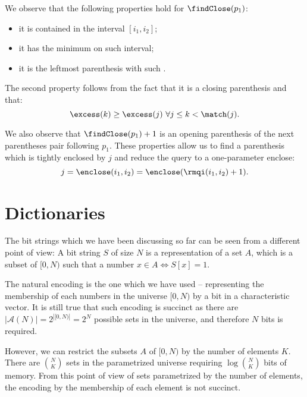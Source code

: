 We observe that the following properties hold for $\findClose(p_1)$:
\begin{itemize}
	\item it is contained in the interval $[i_1, i_2]$;
	\item it has the minimum \excess{} on such interval;
	\item it is the leftmost parenthesis with such \excess{}.
\end{itemize}
The second property follows from the fact that it is a closing parenthesis and that:
$$ \excess(k) \ge \excess(j) \ \forall j \le k < \match(j). $$

We also observe that $\findClose(p_1) + 1$ is an opening parenthesis of the next parentheses pair following $p_1$.
These properties allow us to find a parenthesis which is tightly enclosed by $j$ and reduce the query to a one-parameter enclose:
$$ j = \enclose(i_1, i_2) = \enclose(\rmqi(i_1, i_2) + 1). $$

\section{Dictionaries}

The bit strings which we have been discussing so far can be seen from a different point of view:
A bit string $S$ of size $N$ is a representation of a set $A$, which is a subset of $[0, N)$ such that a number $x \in A \iff S[x] = 1$.

The natural encoding is the one which we have used -- representing the membership of each numbers in the universe $[0, N)$ by a bit in a characteristic vector.
It is still true that such encoding is succinct as there are $| \mathcal{A}(N) | = 2^{|[0, N)|} = 2^N$ possible sets in the universe, and therefore $N$ bits is required.

However, we can restrict the subsets $A$ of $[0, N)$ by the number of elements $K$.
There are ${N \choose K}$ sets in the parametrized universe requiring $\log {N \choose K}$ bits of memory.
From this point of view of sets parametrized by the number of elements, the encoding by the membership of each element is not succinct.

\bigbreak


